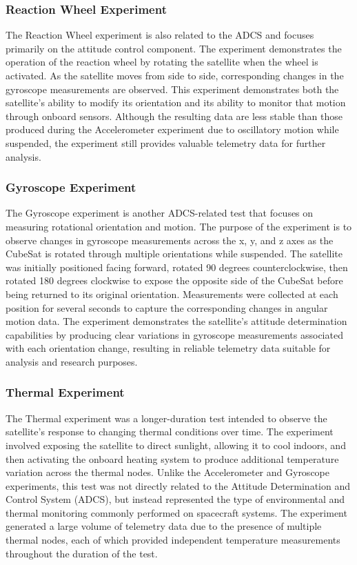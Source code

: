 \documentclass[conference]{IEEEtran}
\begin{document}
\subsubsection{Reaction Wheel Experiment}
The Reaction Wheel experiment is also related to the ADCS and focuses primarily on the attitude control component. The experiment demonstrates the operation of the reaction wheel by rotating the satellite when the wheel is activated. As the satellite moves from side to side, corresponding changes in the gyroscope measurements are observed. This experiment demonstrates both the satellite's ability to modify its orientation and its ability to monitor that motion through onboard sensors. Although the resulting data are less stable than those produced during the Accelerometer experiment due to oscillatory motion while suspended, the experiment still provides valuable telemetry data for further analysis.

\subsubsection{Gyroscope Experiment}
The Gyroscope experiment is another ADCS-related test that focuses on measuring rotational orientation and motion. The purpose of the experiment is to observe changes in gyroscope measurements across the x, y, and z axes as the CubeSat is rotated through multiple orientations while suspended. The satellite was initially positioned facing forward, rotated 90 degrees counterclockwise, then rotated 180 degrees clockwise to expose the opposite side of the CubeSat before being returned to its original orientation. Measurements were collected at each position for several seconds to capture the corresponding changes in angular motion data. The experiment demonstrates the satellite's attitude determination capabilities by producing clear variations in gyroscope measurements associated with each orientation change, resulting in reliable telemetry data suitable for analysis and research purposes.

\subsubsection{Thermal Experiment}
The Thermal experiment was a longer-duration test intended to observe the satellite's response to changing thermal conditions over time. The experiment involved exposing the satellite to direct sunlight, allowing it to cool indoors, and then activating the onboard heating system to produce additional temperature variation across the thermal nodes. Unlike the Accelerometer and Gyroscope experiments, this test was not directly related to the Attitude Determination and Control System (ADCS), but instead represented the type of environmental and thermal monitoring commonly performed on spacecraft systems. The experiment generated a large volume of telemetry data due to the presence of multiple thermal nodes, each of which provided independent temperature measurements throughout the duration of the test.
\end{document}

